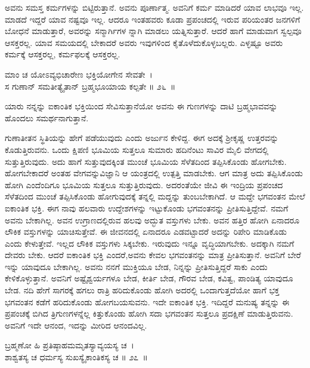 ಅವನು ಸಮಸ್ತ ಕರ್ಮಗಳನ್ನು ಬಿಟ್ಟಿರುತ್ತಾನೆ. ಅವನು ಪೂರ್ಣಾತ್ಮ. ಅವನಿಗೆ ಕರ್ಮ ಮಾಡಿದರೆ ಯಾವ ಲಾಭವೂ ಇಲ್ಲ. ಮಾಡದೆ ಇದ್ದರೆ ಯಾವ ನಷ್ಟವೂ ಇಲ್ಲ. ಆದರೂ ಇಂತಹವರು ಕೂಡಾ ಪ್ರಪಂಚದಲ್ಲಿ ಇರುವ ಪರಿಯಂತರ ಜನಗಳಿಗೆ ಬೋಧನೆ ಮಾಡುತ್ತಾರೆ, ಅವರನ್ನು ಸನ್ಮಾರ್ಗಿಗಳ ನ್ನಾಗಿ ಮಾಡಲು ಯತ್ನಿಸುತ್ತಾರೆ. ಆದರೆ ಹಾಗೆ ಮಾಡುವಾಗ ಸ್ವಲ್ಪವೂ ಆಸಕ್ತರಲ್ಲ. ಯಾವ ಸಮಯದಲ್ಲಿ ಬೇಕಾದರೆ ಅವರು ಇವುಗಳಿಂದ ಕೈತೊಳೆದುಕೊಳ್ಳಬಲ್ಲರು. ಎಳ್ಳಷ್ಟೂ ಅವರು ಕರ್ಮಕ್ಕೆ ಆಸಕ್ತರಲ್ಲ, ಕರ್ಮಫಲಕ್ಕೆ ಆಸಕ್ತರಲ್ಲ.

\begin{shloka}
ಮಾಂ ಚ ಯೋಽವ್ಯಭಿಚಾರೇಣ ಭಕ್ತಿಯೋಗೇನ ಸೇವತೇ~।\\ಸ ಗುಣಾನ್ ಸಮತೀತ್ಯೈತಾನ್ ಬ್ರಹ್ಮಭೂಯಾಯ ಕಲ್ಪತೇ \hfill॥ ೨೬~॥
\end{shloka}

\begin{artha}
ಯಾರು ನನ್ನನ್ನು ಐಕಾಂತಿಕ ಭಕ್ತಿಯಿಂದ ಸೇವಿಸುತ್ತಾನೆಯೋ ಅವನು ಈ ಗುಣಗಳನ್ನು ದಾಟಿ ಬ್ರಹ್ಮಭಾವವನ್ನು ಹೊಂದಲು ಸಮರ್ಥನಾಗುತ್ತಾನೆ.
\end{artha}

ಗುಣಾತೀತನ ಸ್ಥಿತಿಯನ್ನು ಹೇಗೆ ಪಡೆಯುವುದು ಎಂದು ಅರ್ಜುನ ಕೇಳಿದ್ದ. ಈಗ ಅದಕ್ಕೆ ಶ‍್ರೀಕೃಷ್ಣ ಉತ್ತರವನ್ನು ಕೊಡುತ್ತಿರುವನು. ಒಂದು ಕ್ಷಿಪಣಿ ಭೂಮಿಯ ಸುತ್ತಲೂ ಸುಮಾರು ಹದಿನೆಂಟು ಸಾವಿರ ಮೈಲಿ ವೇಗದಲ್ಲಿ ಸುತ್ತುತ್ತಿರುವುದು. ಅದು ಹಾಗೆ ಸುತ್ತುವುದಕ್ಕಿಂತ ಮುಂಚೆ ಭೂಮಿಯ ಸೆಳೆತದಿಂದ ತಪ್ಪಿಸಿಕೊಂಡು ಹೋಗಬೇಕು. ಹೋಗಬೇಕಾದರೆ ಅಂತಹ ವೇಗವನ್ನು\break ವಿಜ್ಞಾನಿ ಆ ಯಂತ್ರದಲ್ಲಿ ಉತ್ಪತ್ತಿ ಮಾಡಬೇಕು. ಆಗ ಮಾತ್ರ ಅದು ತಪ್ಪಿಸಿಕೊಂಡು ಹೋಗಿ ಎಂದೆಂದಿಗೂ ಭೂಮಿಯ ಸುತ್ತಲೂ ಸುತ್ತುತ್ತಿರುವುದು. ಅದರಂತೆಯೇ ಜೀವಿ ಈ ಇಂದ್ರಿಯ ಪ್ರಪಂಚದ ಸೆಳೆತದಿಂದ ಮುಂಚೆ ತಪ್ಪಿಸಿಕೊಂಡು ಹೋಗುವುದಕ್ಕೆ ತನ್ನಲ್ಲಿ ಮದ್ದನ್ನು ತುಂಬಬೇಕಾ\-ಗಿದೆ. ಆ ಮದ್ದೇ ಭಗವಂತನ ಮೇಲೆ ಐಕಾಂತಿಕ ಭಕ್ತಿ. ಈಗ ನಾವು ಹಲವಾರು ಉದ್ದೇಶಗಳನ್ನು ಇಟ್ಟುಕೊಂಡು ಭಗವಂತನನ್ನು ಪ್ರೀತಿಸುತ್ತಿದ್ದೇವೆ. ನಮಗೆ ಅವನು ಬೇಕಾಗಿಲ್ಲ. ಅವನ ಉಗ್ರಾಣದಲ್ಲಿರುವ ಹಲವು ಅದ್ಭುತ ವಸ್ತುಗಳು ಬೇಕು. ಅವನ ಹತ್ತಿರ ಹೋಗಿ ಏನಾದರೂ ಲೌಕಿಕ ವಸ್ತುಗಳನ್ನು ಯಾಚಿಸುತ್ತೇವೆ. ಈ ಜೀವನದಲ್ಲಿ ಏನಾದರೂ ಎಡವಟ್ಟಾದರೆ ಅದನ್ನು ರಿಪೇರಿ ಮಾಡಿಕೊಡು ಎಂದು ಕೇಳುತ್ತೇವೆ. ಇಲ್ಲದ ಲೌಕಿಕ ವಸ್ತುಗಳು ಸಿಕ್ಕಬೇಕು. ಇರುವುದು ಇನ್ನೂ ವೃದ್ಧಿಯಾಗಬೇಕು. ಅದಕ್ಕಾಗಿ ನಮಗೆ ದೇವರು ಬೇಕು. ಆದರೆ ಐಕಾಂತಿಕ ಭಕ್ತಿ ಎಂದರೆ,ಅವನು ಕೇವಲ ಭಗವಂತನನ್ನು ಮಾತ್ರ ಪ್ರೀತಿಸುತ್ತಾನೆ. ಅವನಿಗೆ ಬೇರೆ ಇನ್ನು ಯಾವುದೂ ಬೇಕಾಗಿಲ್ಲ. ಅವನು ನನಗೆ ಮುಕ್ತಿಯೂ ಬೇಡ, ನಿನ್ನನ್ನು ಪ್ರೀತಿಸುತ್ತಿದ್ದರೆ ಸಾಕು ಎಂದು ಕೇಳಿಕೊಳ್ಳುತ್ತಾನೆ. ಅವನಿಗೆ ಅಷ್ಟೈಶ್ವರ್ಯಗಳೂ ಬೇಡ, ಕೀರ್ತಿ ಬೇಡ, ಗೌರವ ಬೇಡ, ಕವಿತ್ವ, ಪಾಂಡಿತ್ಯ ಯಾವುದೂ ಬೇಡ. ನದಿ ಹೇಗೆ ಸಾಗರಕ್ಕೆ ಹಗಲು ರಾತ್ರಿ ಹರಿದುಕೊಂಡು ಹೋಗಿ ಅದರಲ್ಲಿ ಒಂದಾಗುತ್ತದೆಯೋ ಹಾಗೆ ಭಕ್ತ ಭಗವಂತನ ಕಡೆಗೆ ಹರಿದುಕೊಂಡು ಹೋಗಬಯಸುವನು. ಇದೇ ಐಕಾಂತಿಕ ಭಕ್ತಿ. ಇದಿದ್ದರೆ ಮನುಷ್ಯ ತನ್ನನ್ನು ಈ ಪ್ರಪಂಚಕ್ಕೆ ಬಿಗಿದ ತ್ರಿಗುಣಗಳನ್ನೆಲ್ಲ ಕಿತ್ತುಕೊಂಡು ಹೋಗಿ ಸದಾ ಭಗವಂತನ ಸುತ್ತಲೂ ಪ್ರದಕ್ಷಿಣೆ ಮಾಡುತ್ತಿರುವನು. ಅವನಿಗೆ ಇದೇ ಆನಂದ, ಇದನ್ನು ಮೀರಿದ ಆನಂದವಿಲ್ಲ.

\begin{shloka}
ಬ್ರಹ್ಮಣೋ ಹಿ ಪ್ರತಿಷ್ಠಾಹಮಮೃತಸ್ಯಾವ್ಯಯಸ್ಯ ಚ~।\\ಶಾಶ್ವತಸ್ಯ ಚ ಧರ್ಮಸ್ಯ ಸುಖಸ್ಯೈಕಾಂತಿಕಸ್ಯ ಚ \hfill॥ ೨೭~॥
\end{shloka}

